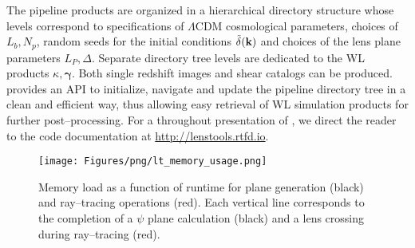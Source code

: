 The pipeline products are organized in a hierarchical directory structure whose levels correspond to specifications of $\Lambda$CDM cosmological parameters, choices of $L_b,N_p$, random seeds for the initial conditions $\tilde{\delta}(\mathbf{k})$ and choices of the lens plane parameters $L_P,\Delta$. Separate directory tree levels are dedicated to the WL products $\kappa,\pmb{\gamma}$. Both single redshift images and shear catalogs can be produced. \LT\, provides an API to initialize, navigate and update the pipeline directory tree in a clean and efficient way, thus allowing easy retrieval of WL simulation products for further post--processing. For a throughout presentation of \LT, we direct the reader to the code documentation at \url{http://lenstools.rtfd.io}. 
\begin{figure}
\begin{center}
\texttt{[image: Figures/png/lt\_memory\_usage.png]}
\end{center}
\caption{Memory load as a function of runtime for plane generation (black) and ray--tracing operations (red). Each vertical line corresponds to the completion of a $\psi$ plane calculation (black) and a lens crossing during ray--tracing (red).}
\label{fig:3:lt-memory}
\end{figure}
    

%